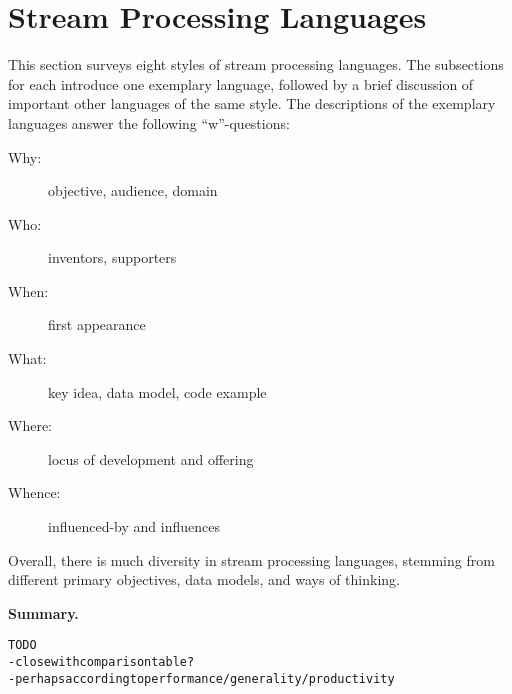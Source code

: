 \section{Stream Processing Languages}\label{sec:languages}

This section surveys eight styles of stream processing languages.  The
subsections for each introduce one exemplary language, followed by a
brief discussion of important other languages of the same style. The
descriptions of the exemplary languages answer the following
``w''-questions:

\begin{description}
  \item[Why:] objective, audience, domain
  \item[Who:] inventors, supporters
  \item[When:] first appearance
  \item[What:] key idea, data model, code example
  \item[Where:] locus of development and offering
  \item[Whence:] influenced-by and influences
\end{description}

Overall, there is much diversity in stream processing languages,
stemming from different primary objectives, data models, and ways of
thinking.









\textbf{Summary.}
\begin{alltt}TODO\scriptsize
- close with comparison table?
- perhaps according to performance/generality/productivity
\end{alltt}

